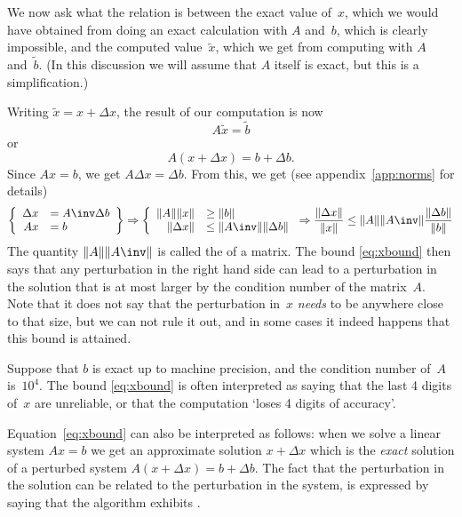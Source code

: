 We now ask what the relation is between the exact value of~$x$, which
we would have obtained from doing an exact calculation with $A$
and~$b$, which is clearly impossible, and
the computed value~$\tilde x$, which we get from computing with $A$
and~$\tilde b$. (In this discussion we will assume that $A$ itself is
exact, but this is a simplification.)

Writing $\tilde x= x+\Delta x$, the result of our computation is now
\begin{equation}
  A\tilde x = \tilde b
\end{equation}
or 
\begin{equation}
  A(x+\Delta x)=b+\Delta b.
\end{equation}
Since $Ax=b$, we get $A\Delta x=\Delta b$. From this, we get
(see appendix~\ref{app:norms} for details)
\begin{equation}
 \left \{
\begin{array}{rl}
  \Delta x&=A\inv \Delta b\\ Ax&=b
\end{array} \right\} \Rightarrow \left\{
\begin{array}{rl}
  \|A\| \|x\|&\geq\|b\| \\ \|\Delta x\|&\leq \|A\inv\| \|\Delta b\|
\end{array} \right.
\Rightarrow
\frac{\|\Delta x\|}{\|x\|}
\leq 
\|A\| \|A\inv\| \frac{\|\Delta b\|}{\|b\|}
    \label{eq:xbound}
\end{equation}
The quantity $\|A\| \|A\inv\|$ is called the
 of a matrix.
The bound \eqref{eq:xbound} then says that any
perturbation in the right hand side can lead to a perturbation in the
solution that is at most larger by the condition number of the
matrix~$A$. Note that it does not say that the perturbation in~$x$
\emph{needs} to be anywhere close to that size, but we can not rule it
out, and in some cases it indeed happens that this bound is attained.

Suppose that $b$ is exact up to machine precision, and the
condition number of~$A$ is~$10^4$. The bound \eqref{eq:xbound} is
often interpreted as saying that the last 4 digits of~$x$ are
unreliable, or that the computation `loses 4 digits of accuracy'.

Equation~\eqref{eq:xbound} can also be interpreted as follows: when we
solve a linear system $Ax=b$ we get an approximate solution $x+\Delta
x$ which is the \emph{exact} solution of a perturbed system
$A(x+\Delta x)=b+\Delta b$. The fact that the perturbation in the
solution can be related to the perturbation in the system, is
expressed by saying that the algorithm exhibits .

